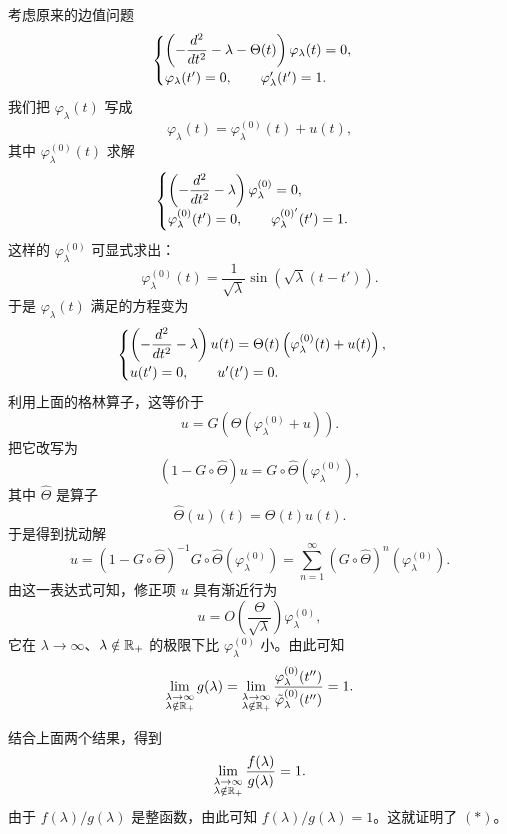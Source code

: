 考虑原来的边值问题
\[
\begin{cases}
\left(-\dfrac{d^2}{d t^2}-\lambda-\Theta(t)\right)\varphi_\lambda(t)=0,\\[2mm]
\varphi_\lambda(t')=0,\qquad \varphi'_\lambda(t')=1.
\end{cases}
\]
我们把 $\varphi_\lambda(t)$ 写成
\[
\varphi_\lambda(t)=\varphi^{(0)}_\lambda(t)+u(t),
\]
其中 $\varphi^{(0)}_\lambda(t)$ 求解
\[
\begin{cases}
\left(-\dfrac{d^2}{d t^2}-\lambda\right)\varphi^{(0)}_\lambda=0,\\[2mm]
\varphi^{(0)}_\lambda(t')=0,\qquad \varphi^{(0)'}_\lambda(t')=1.
\end{cases}
\]
这样的 $\varphi^{(0)}_\lambda$ 可显式求出：
\[
\varphi^{(0)}_\lambda(t)=\frac{1}{\sqrt\lambda}\sin\left(\sqrt\lambda(t-t')\right).
\]
于是 $\varphi_\lambda(t)$ 满足的方程变为
\[
\begin{cases}
\left(-\dfrac{d^2}{d t^2}-\lambda\right)u(t)=\Theta(t)\left(\varphi^{(0)}_\lambda(t)+u(t)\right),\\[2mm]
u(t')=0,\qquad u'(t')=0.
\end{cases}
\]
利用上面的格林算子，这等价于
\[
u=G\left(\Theta\left(\varphi^{(0)}_\lambda+u\right)\right).
\]
把它改写为
\[
(1-G\circ\hat\Theta)u=G\circ\hat\Theta\left(\varphi^{(0)}_\lambda\right),
\]
其中 $\hat\Theta$ 是算子
\[
\hat\Theta(u)(t)=\Theta(t)u(t).
\]
于是得到扰动解
\[
u=(1-G\circ\hat\Theta)^{-1}G\circ\hat\Theta\left(\varphi^{(0)}_\lambda\right)
=\sum_{n=1}^{\infty}(G\circ\hat\Theta)^n\left(\varphi^{(0)}_\lambda\right).
\]
由这一表达式可知，修正项 $u$ 具有渐近行为
\[
u=O\left(\frac{\Theta}{\sqrt\lambda}\right)\varphi^{(0)}_\lambda,
\]
它在 $\lambda\to\infty$、$\lambda\notin\mathbb{R}_+$ 的极限下比 $\varphi^{(0)}_\lambda$ 小。由此可知
\[
\lim_{\substack{\lambda\to\infty\\ \lambda\notin\mathbb{R}_+}}g(\lambda)
=\lim_{\substack{\lambda\to\infty\\ \lambda\notin\mathbb{R}_+}}
\frac{\varphi^{(0)}_\lambda(t'')}{\tilde\varphi^{(0)}_\lambda(t'')}=1.
\]

结合上面两个结果，得到
\[
\lim_{\substack{\lambda\to\infty\\ \lambda\notin\mathbb{R}_+}}
\frac{f(\lambda)}{g(\lambda)}=1.
\]
由于 $f(\lambda)/g(\lambda)$ 是整函数，由此可知 $f(\lambda)/g(\lambda)=1$。这就证明了 $(*)$。

